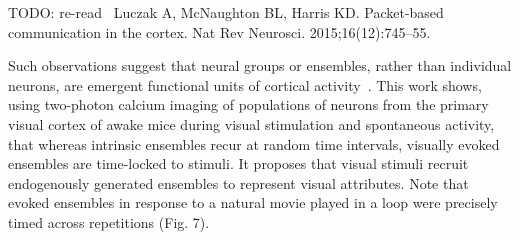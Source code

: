 \documentclass[brainsci, %
               review,submit,pdftex,moreauthors
               ]{Definitions/mdpi}
\begin{document}
TODO: re-read~\citep{luczak_packet-based_2015} Luczak A, McNaughton BL, Harris KD. Packet-based communication in the cortex. Nat Rev Neurosci. 2015;16(12):745--55.

Such observations suggest that neural groups or ensembles, rather than individual neurons, are emergent functional units of cortical activity~\citep{miller_visual_2014}. This work shows, using two-photon calcium imaging of populations of neurons from the primary visual cortex of awake mice during visual stimulation and spontaneous activity, that whereas intrinsic ensembles recur at random time intervals, visually evoked ensembles are time-locked to stimuli. It proposes that visual stimuli recruit endogenously generated ensembles to represent visual attributes. Note that evoked ensembles in response to a natural movie played in a loop were precisely timed across repetitions (Fig. 7).

\end{document}
